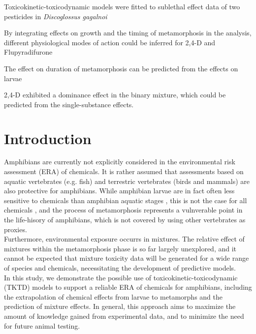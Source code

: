 \documentclass[preprint,12pt]{elsarticle}
\begin{document}
\begin{frontmatter}
\begin{highlights}
\item Toxicokinetic-toxicodynamic models were fitted to sublethal effect data of two pesticides in \textit{Discoglossus gagalnoi}
\item By integrating effects on growth and the timing of metamorphosis in the analysis, different physiological modes of action could be inferred for 2,4-D and Flupyradifurone
\item The effect on duration of metamorphosis can be predicted from the effects on larvae
\item 2,4-D exhibited a dominance effect in the binary mixture, which could be predicted from the single-substance effects.
\end{highlights}

\begin{keyword}

\end{keyword}

\end{frontmatter}

\section{Introduction}
%
Amphibians are currently not explicitly considered in the environmental risk assessment (ERA) of chemicals. 
It is rather assumed that assessments based on aquatic vertebrates (e.g. fish) 
and terrestric vertebrates (birds and mammals) are also protective for amphibians. 
While amphibian larvae are in fact often less sensitive to chemicals 
than amphibian aquatic stages \citep{weltjeCOMPARATIVEACUTECHRONIC2013}, 
this is not the case for all chemicals \citep{glabermanEvaluatingRoleFish2019}, 
and the process of metamorphosis represents a vulnverable point in the life-hisory of amphibians, 
which is not covered by using other vertebrates as proxies.\\
Furthermore, environmental exposure occurrs in mixtures. 
The relative effect of mixtures within the metamorphosis phase is so far largely unexplored, 
and it cannot be expected that mixture toxicity data will be generated for a wide range 
of species and chemicals, necessitating the development of predictive models.\\
%
In this study, we demonstrate the possible use of toxicokinetic-toxicodynamic (TKTD) models 
to support a reliable ERA of chemicals for amphibians, including the extrapolation 
of chemical effects from larvae to metamorphs and the prediction of mixture effects. 
In general, this approach aims to maximize the amount of knowledge gained 
from experimental data, 
and to minimize the need for future animal testing. \\
%
\end{document}
